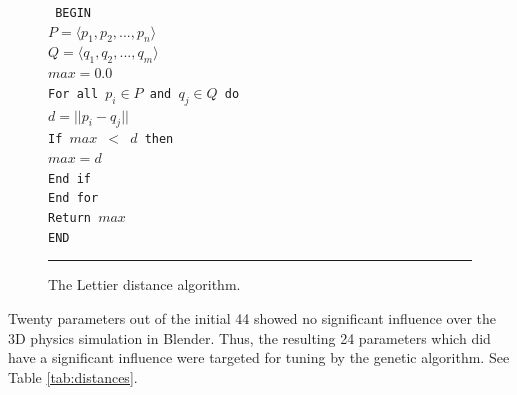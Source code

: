 \begin{figure}[htbp]
\begin{center}
\begin{varwidth}{\textwidth}
{\tt
BEGIN \\
\tab $P = \langle p_1, p_2,...,p_n\rangle$ \\
\tab $Q = \langle q_1, q_2,...,q_m\rangle$ \\
\tab $max = 0.0$ \\
\tab For all $p_i\in P$ and $q_j \in Q$ do \\
\tab \tab $d = ||p_i-q_j||$ \\
\tab \tab If $max$ $<$ $d$ then \\
\tab \tab \tab $max=d$ \\
\tab \tab End if \\
\tab End for \\
\tab Return $max$ \\
END \\
}
\end{varwidth}
\end{center}
\centering
\rule{35em}{0.5pt}
\caption[Lettier Distance Algorithm]{The Lettier distance algorithm.}
\label{lettierdistance}
\end{figure}

Twenty parameters out of the initial 44 showed no significant influence over the 3D physics simulation in Blender. Thus, the resulting 24 parameters which did have a significant influence were targeted for tuning by the genetic algorithm. See Table \ref{tab:distances}.

